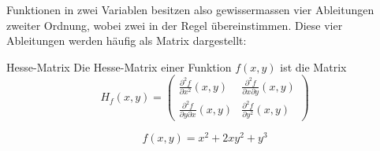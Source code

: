 Funktionen in zwei Variablen besitzen also gewissermassen vier Ableitungen zweiter Ordnung, wobei zwei in der Regel übereinstimmen. Diese vier Ableitungen werden häufig als Matrix dargestellt:

\begin{definition}
	{Hesse-Matrix}{}
	Die Hesse-Matrix einer Funktion \(f(x,y)\) ist die Matrix
	\[
		H_f(x,y) = \begin{pmatrix}
			\frac{\partial^2 f}{\partial x^2}(x,y)          & \frac{\partial^2 f}{\partial x \partial y}(x,y) \\
			\frac{\partial^2 f}{\partial y \partial x}(x,y) & \frac{\partial^2 f}{\partial y^2}(x,y)
		\end{pmatrix}
	\]
\end{definition}

\begin{bsp}
	{}{}
	$$f(x,y)=x^2+2xy^2+y^3 $$
	\vspace*{10cm}
\end{bsp}

